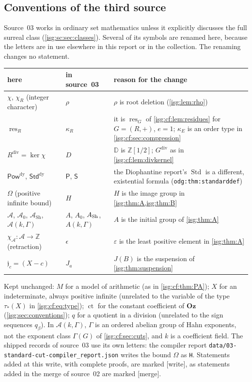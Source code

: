 \documentclass[11pt]{article}
\theoremstyle{definition}
\theoremstyle{remark}
\newcommand{\Oz}{\ensuremath{\mathbf{Oz}}}
\newcommand{\Z}{\mathbb{Z}}
\newcommand{\D}{\mathbb{D}}
\newcommand{\ct}{\operatorname{ct}}
\newcommand{\res}{\operatorname{res}}
\newcommand{\dv}{\mathrm{div}}
\newcommand{\PowDy}{\mathsf{Pow}^{\mathrm{dy}}}
\newcommand{\StdDy}{\mathsf{Std}^{\mathrm{dy}}}
\newcommand{\Asc}{\mathcal{A}}
\newcommand{\replabel}[1]{\nolinkurl{#1}}
\newcommand{\fn}[1]{\nolinkurl{#1}}
\begin{document}
\subsection{Conventions of the third source}\label{isg:sc:sec:conventions}
Source~03 works in ordinary set mathematics unless it explicitly
discusses the full surreal class (\cref{isg:sc:sec:classes}). Several of
its symbols are renamed here, because the letters are in use elsewhere in
this report or in the collection. The renaming changes no statement.
\begin{center}\small
\begin{tabular}{@{}p{}p{}p{}@{}}
\toprule
here & in source~03 & reason for the change\\
\midrule
$\chi$, $\chi_R$ (integer character) & $\rho$ & $\rho$ is root deletion
 (\cref{isg:lem:rho})\\
$\res_R$ & $\kappa_R$ & it is $\res_G$ of \cref{isg:cf:lem:residues} for
 $G=(R,+)$, $e=1$; $\kappa_E$ is an order type in
 \cref{isg:cf:sec:compression}\\
$R^{\dv}=\ker\chi$ & $D$ & $\D$ is $\Z[1/2]$; $G^{\dv}$ as in
 \cref{isg:cf:lem:divkernel}\\
$\PowDy$, $\StdDy$ & $\mathsf P$, $\mathsf S$ & the Diophantine report's
 $\operatorname{Std}$ is a different, existential formula
 (\replabel{odg:thm:standarddef})\\
$\Omega$ (positive infinite bound) & $H$ & $H$ is the image group in
 \cref{isg:thm:A,isg:thm:B}\\
$\Asc$, $\Asc_0$, $\Asc_{\mathrm{Sh}}$, $\Asc(k,\Gamma)$ & $A$, $A_0$,
 $A_{\rm Sh}$, $A(k,\Gamma)$ & $A$ is the initial group of
 \cref{isg:thm:A}\\
$\chi_{\Asc}:\Asc\to\Z$ (retraction) & $\epsilon$ & $\varepsilon$ is the
 least positive element in \cref{isg:thm:A}\\
$\mathfrak j_c=(X-c)$ & $J_a$ & $J(B)$ is the suspension of
 \cref{isg:thm:suspension}\\
\bottomrule
\end{tabular}
\end{center}
Kept unchanged: $M$ for a model of arithmetic (as in \cref{isg:cf:thm:PA});
$X$ for an indeterminate, always positive infinite (unrelated to the
variable of the type $\tau_*(X)$ in \eqref{isg:cf:eq:type}); $\ct$ for the
constant coefficient of $\Oz$ (\cref{isg:sec:conventions}); $q$ for a
quotient in a division (unrelated to the sign sequences $q_\beta$). In
$\Asc(k,\Gamma)$, $\Gamma$ is an ordered abelian group of Hahn exponents,
not the exponent class $\Gamma(G)$ of \cref{isg:cf:sec:cuts}, and $k$ is a
coefficient field. The shipped records of source~03 use its own letters:
the compiler report \fn{data/03-standard-cut-compiler_report.json} writes
the bound $\Omega$ as \texttt{H}. Statements added at this write, with
complete proofs, are marked \textup{[write]}, as statements added in the
merge of source~02 are marked \textup{[merge]}.
\end{document}

